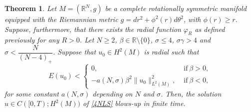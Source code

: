 \documentclass[10pt,leqno]{amsart}
\newtheorem{thm}{Theorem}[section]
\numberwithin{equation}{section}
\newcommand{\field}[1]{\mathbb{#1}}
\newcommand{\R}{\field{R}}          		%
\begin{document}
\begin{thm} 
Let $M=(\R^N,g)$ be a complete rotationally symmetric manifold equipped with the Riemannian metric 
$g =dr^2 +\phi^2(r) d\theta^2$, with $\phi(r)\ge r$. Suppose, furthermore, that there exists the radial function $\varphi_R$ as defined previously for any $R>0$.
Let $N\geq 2$, $\beta \in \R\setminus\{0\}$, $\sigma \leq 4$, $\sigma \gamma >4$ and $\sigma < \dfrac{N}{(N-4)_+}$.  Suppose that $u_0 \in H^2 (M)$ is radial such that
$$E(u_0)<\begin{cases}0,&\mbox{ if}\ \beta > 0,\\ - a(N,\sigma) \beta^2 \|u_0\|_{L^2 (M)}^2,&\mbox{ if}\ \beta<0, \end{cases}$$
for some constant $a(N,\sigma)$ depending on $N$ and $\sigma$. 
Then, the solution $u\in C([0,T);H^2 (M))$ of \eqref{4NLS} blows-up in finite time.
\end{thm}
\end{document}
